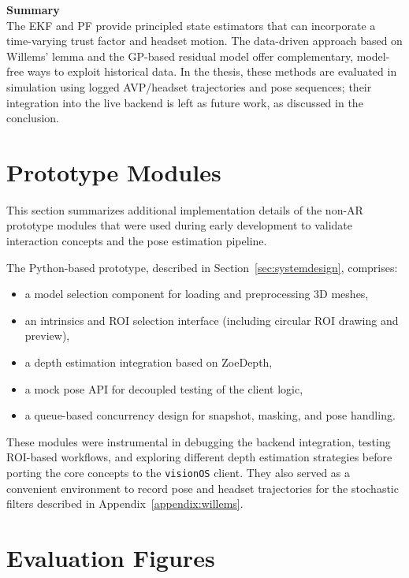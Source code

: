 \textbf{Summary} \\
The EKF and PF provide principled state estimators that can incorporate a time-varying trust factor and headset motion. The data-driven approach based on Willems’ lemma and the GP-based residual model offer complementary, model-free ways to exploit historical data. In the thesis, these methods are evaluated in simulation using logged AVP/headset trajectories and pose sequences; their integration into the live backend is left as future work, as discussed in the conclusion.

\section{Prototype Modules}
\label{appendix:prototype-modules}

This section summarizes additional implementation details of the non-AR prototype modules that were used during early development to validate interaction concepts and the pose estimation pipeline.

The Python-based prototype, described in Section~\ref{sec:systemdesign}, comprises:
\begin{itemize}
    \item a model selection component for loading and preprocessing 3D meshes,
    \item an intrinsics and ROI selection interface (including circular ROI drawing and preview),
    \item a depth estimation integration based on ZoeDepth,
    \item a mock pose API for decoupled testing of the client logic,
    \item a queue-based concurrency design for snapshot, masking, and pose handling.
\end{itemize}

These modules were instrumental in debugging the backend integration, testing ROI-based workflows, and exploring different depth estimation strategies before porting the core concepts to the \texttt{visionOS} client. They also served as a convenient environment to record pose and headset trajectories for the stochastic filters described in Appendix~\ref{appendix:willems}.

\section{Evaluation Figures}
\label{appendix:evaluationfigures}

